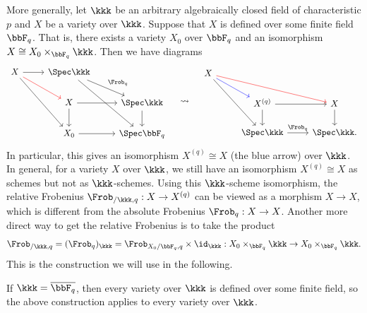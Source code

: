   More generally, let $\kkk$ be an arbitrary algebraically closed field of characteristic $p$ and $X$ be a variety over $\kkk$.
  Suppose that $X$ is defined over some finite field $\bbF_q$.
  That is, there exists a variety $X_0$ over $\bbF_q$ and an isomorphism $X \cong X_0 \times_{\bbF_q} \kkk$.
  Then we have diagrams
  \[ 
    \begin{tikzcd}
      X \arrow[r] \arrow[rdd] \arrow[rd, red] & \Spec \kkk \arrow[rd, "\Frob_q"] \arrow[rdd] & \\
      & X \arrow[r] \arrow[d] & \Spec \kkk \arrow[d] \\
      & X_0 \arrow[r] & \Spec \bbF_q
    \end{tikzcd}
    \quad \leadsto \quad
    \begin{tikzcd}
      X \arrow[rrd, red] \arrow[rdd] \arrow[rd, blue] & & \\
      & X^{(q)} \arrow[r] \arrow[d] & X \arrow[d] \\
      & \Spec \kkk \arrow[r, "\Frob_q"] & \Spec \kkk.
    \end{tikzcd} 
  \]
  In particular, this gives an isomorphism $X^{(q)} \cong X$ (the blue arrow) over $\kkk$.
  In general, for a variety $X$ over $\kkk$, we still have an isomorphism $X^{(q)} \cong X$ as schemes but not as $\kkk$-schemes.
  Using this $\kkk$-scheme isomorphism, the relative Frobenius $\Frob_{/\kkk,q}: X \to X^{(q)}$ can be viewed as a morphism $X \to X$, which is different from the absolute Frobenius $\Frob_q: X \to X$.
  Another more direct way to get the relative Frobenius is to take the product 
  \[ \Frob_{/\kkk,q} = (\Frob_{q})_\kkk = \Frob_{X_0/\bbF_q, q} \times \id_\kkk: X_0 \times_{\bbF_q} \kkk \to X_0 \times_{\bbF_q} \kkk. \]
  This is the construction we will use in the following.

  If $\kkk = \overline{\bbF_q}$, then every variety over $\kkk$ is defined over some finite field, so the above construction applies to every variety over $\kkk$.

